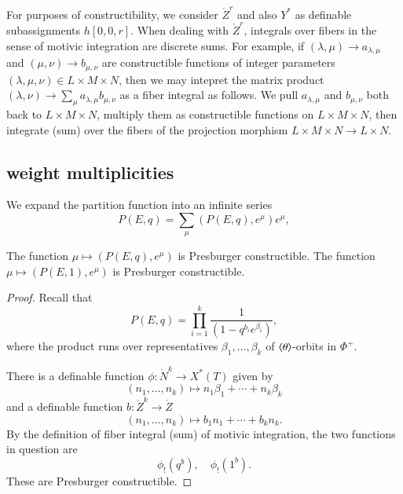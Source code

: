 \begin{remark}\label{rem:matrix}
For purposes of constructibility, we consider $\ring{Z}^r$ and also $Y^*$ as 
definable subassignments $h[0,0,r]$. When dealing with $\ring{Z}^r$, integrals over fibers
in the sense of motivic integration are discrete sums.  For example, if $(\lambda,\mu)\to a_{\lambda,\mu}$
and $(\mu,\nu)\to b_{\mu,\nu}$ are constructible functions of integer parameters $(\lambda,\mu,\nu)\in L\times M\times N$,
then we may intepret the matrix product $(\lambda,\nu)\to \sum_{\mu} a_{\lambda,\mu} b_{\mu,\nu}$ as a
fiber integral as follows.  We pull $a_{\lambda,\mu}$ and $b_{\mu,\nu}$ both back to $L\times M\times N$, multiply
them as constructible functions on $L\times M\times N$, then integrate (sum) over the fibers of the projection morphism
$L\times M\times N\to L\times N$.
\end{remark}




\subsection{weight multiplicities}

We expand the partition function into an infinite series
\[
P(E,q) = \sum_\mu (P(E,q),e^\mu) e^{\mu},
\]

\begin{lemma}\label{lemma:partition}
The function $\mu\mapsto (P(E,q),e^\mu)$ is Presburger constructible.
The function $\mu\mapsto (P(E,1),e^\mu)$ is Presburger constructible.
\end{lemma}

\begin{proof} 
Recall that
\[
P(E,q) = \prod_{i=1}^k \frac{1}{ (1-q^{b_i} e^{\beta_i})},
\]
where the product runs over representatives $\beta_1,\ldots,\beta_k$ of $\langle{\theta}\rangle$-orbits in $\Phi^+$.

There is a definable function $\phi:\ring{N}^k\to X^*(T)$ given by
\[
(n_1,\ldots,n_k)\mapsto n_1 \beta_1+\cdots + n_k \beta_k
\]
and a definable function $b:\ring{Z}^k\to \ring{Z}$ 
\[
(n_1,\ldots,n_k)\mapsto b_1 n_1+\cdots + b_k n_k.
\]
By the definition of fiber integral (sum) of motivic integration,  the two  functions in question are
\[
\phi_! (q^b),\quad \phi_!(1^b).
\]
These are Presburger constructible.
\end{proof}


